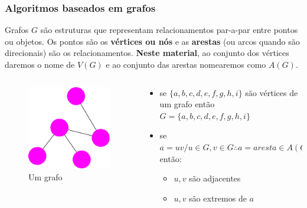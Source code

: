 \begin{frame}
	\frametitle{Algoritmos baseados em grafos}
	\par Grafos $G$ são estruturas que representam relacionamentos par-a-par entre pontos ou objetos. Os pontos são os \textbf{vértices ou nós} e as \textbf{arestas} (ou arcos quando são direcionais) são os relacionamentos. \textbf{Neste material}, ao conjunto dos vértices daremos o nome de $V(G)$ e ao conjunto das arestas nomearemos como $A(G)$.
	\begin{columns}
		\begin{column}{0.3\textwidth}
			\begin{figure}
				\centering
				\includegraphics[width=0.9\linewidth]{images/grafoGenerico}
				\caption{Um grafo}
				\label{fig:grafogenerico}
			\end{figure}
		\end{column}
		\begin{column}{0.7\textwidth}
			\begin{itemize}
				\item se $\{a,b,c,d,e,f,g,h,i\}$ são vértices de um grafo então $G = \{a,b,c,d,e,f,g,h,i\}$
				\item se $a = uv / u \in G, v \in G \therefore  a = aresta \in A(G)$ então:
				\begin{itemize}
					\item $u, v$ são adjacentes
					\item $u, v$ são extremos de $a$

\end{itemize}
\end{itemize}
\end{column}
\end{columns}
\end{frame}
